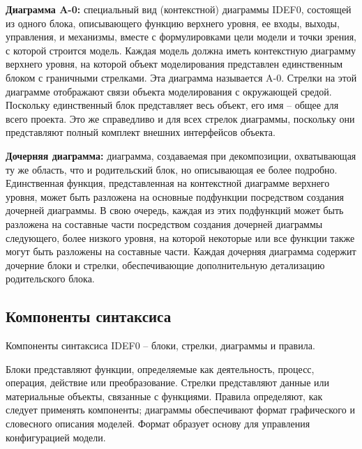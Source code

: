 \documentclass[a4paper, final]{article}
\begin{document}
\par \textbf{Диаграмма A-0: } специальный вид (контекстной) диаграммы IDEF0, состоящей из одного блока, описывающего функцию верхнего уровня, ее входы, выходы, управления, и механизмы, вместе с формулировками цели модели и точки зрения, с которой строится модель. Каждая модель должна иметь контекстную диаграмму верхнего уровня, на которой объект моделирования представлен единственным блоком с граничными стрелками. Эта диаграмма называется A-0. Стрелки на этой диаграмме отображают связи объекта моделирования с окружающей средой. Поскольку единственный блок представляет весь объект, его имя -- общее для всего проекта. Это же справедливо и для всех стрелок диаграммы, поскольку они представляют полный комплект внешних интерфейсов объекта.

\par \textbf{Дочерняя диаграмма: } диаграмма, создаваемая при декомпозиции, охватывающая ту же область, что и родительский блок, но описывающая ее более подробно. Единственная функция, представленная на контекстной диаграмме верхнего уровня, может быть разложена на основные подфункции посредством создания дочерней диаграммы. В свою очередь, каждая из этих подфункций может быть разложена на составные части посредством создания дочерней диаграммы следующего, более низкого уровня, на которой некоторые или все функции также могут быть разложены на составные части. Каждая дочерняя диаграмма содержит дочерние блоки и стрелки, обеспечивающие дополнительную детализацию родительского блока.

\subsection{Компоненты синтаксиса}
Компоненты синтаксиса IDEF0 – блоки, стрелки, диаграммы и правила.
\par Блоки представляют функции, определяемые как деятельность, процесс, операция, действие или преобразование. Стрелки представляют данные или материальные объекты, связанные с функциями. Правила определяют, как следует применять компоненты; диаграммы обеспечивают формат графического и словесного описания моделей. Формат образует основу для управления конфигурацией модели.
\end{document}
